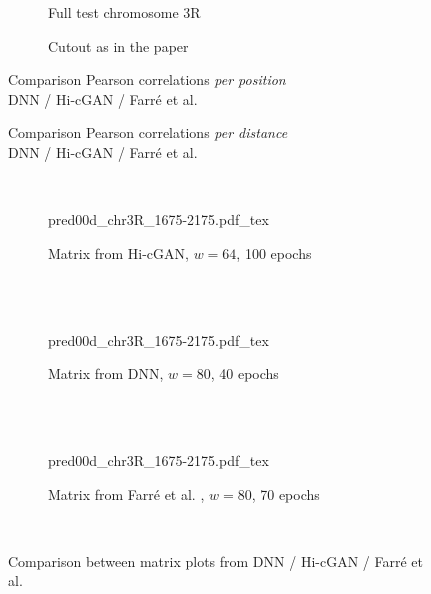 \begin{figure}[htbp]
 \begin{subfigure}{0.45\textwidth}
  \caption{Full test chromosome 3R}
 \end{subfigure}\hfill
 \begin{subfigure}{0.45\textwidth}
  \caption{Cutout as in the paper \cite{Farre2018a}}
 \end{subfigure}
\caption{Comparison Pearson correlations \emph{per position}\\DNN / Hi-cGAN / Farr\'e et al. \cite{Farre2018a}}\label{fig:results:farre-vs-ours_pearson-pos_3R}
\end{figure}
\begin{figure}[htbp]
 \centering
 \caption{Comparison Pearson correlations \emph{per distance}\\DNN / Hi-cGAN / Farr\'e et al. \cite{Farre2018a}}\label{fig:results:farre-vs-ours_pearson-dist_3R}
\end{figure}

\begin{figure}[htbp]
\\
\begin{subfigure}{\textwidth}
 \centering
 \scriptsize
 {pred00d_chr3R_1675-2175.pdf_tex}
 \caption{Matrix from Hi-cGAN, $w=64$, 100 epochs} \label{fig:results:farre-vs-ours_cgan-matrix}
\end{subfigure}\\[5mm]
\\
\begin{subfigure}{\textwidth}
 \centering
 \scriptsize
 {pred00d_chr3R_1675-2175.pdf_tex}
 \caption{Matrix from DNN, $w=80$, 40 epochs} \label{fig:results:farre-vs-ours_dnn-matrix}
\end{subfigure}\\[5mm]
\\
\begin{subfigure}{\textwidth}
 \centering
 \scriptsize
 {pred00d_chr3R_1675-2175.pdf_tex}
 \caption{Matrix from Farr\'e et al. \cite{Farre2018a}, $w=80$, 70 epochs} \label{fig:results:farre-vs-ours_farre-matrix}
\end{subfigure}\\[5mm]
\caption{Comparison between matrix plots from DNN / Hi-cGAN / Farr\'e et al. \cite{Farre2018a}} \label{fig:results:farre-vs-ours_matrices}
\end{figure}

\clearpage

